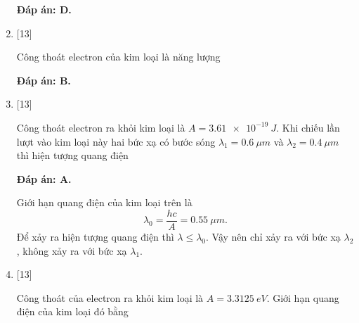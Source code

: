 \begin{enumerate}[label=\bfseries Câu \arabic*:]
	\loigiai
	{		\textbf{Đáp án: D.}
		
		
	}
	
	\item {} [13]
	\cauhoi
	{Công thoát electron của kim loại là năng lượng
	}
	
	\loigiai
	{		\textbf{Đáp án: B.}
		
		
	}
	
	\item {} [13]
	\cauhoi
	{Công thoát electron ra khỏi kim loại là $A = \SI{3,61e-19}{J}$. Khi chiếu lần lượt vào kim loại này hai bức xạ có bước sóng $\lambda_{1} = \SI{0,6}{\mu m}$ và $\lambda_{2} = \SI{0,4}{\mu m}$ thì hiện tượng quang điện
	}
	
	\loigiai
	{		\textbf{Đáp án: A.}
		
		Giới hạn quang điện của kim loại trên là
		$$
		\lambda_{0} = \dfrac{hc}{A} = \SI{0,55}{\mu m}.
		$$
		Để xảy ra hiện tượng quang điện thì $\lambda \leq \lambda_{0}$. Vậy nên chỉ xảy ra với bức xạ $\lambda_{2}$, không xảy ra với bức xạ $\lambda_{1}$.
	}
	
	\item {} [13]
	\cauhoi
	{Công thoát của electron ra khỏi kim loại là $A = \SI{3,3125}{eV}$. Giới hạn quang điện của kim loại đó bằng
	}
	

\end{enumerate}
